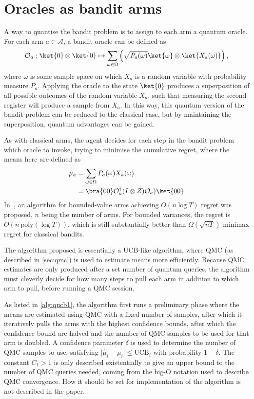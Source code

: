 \section{Oracles as bandit arms}
\label{sec:wan2022}
A way to quantise the bandit problem is to assign to each arm a quantum oracle.
For each arm $a \in \mathcal{A}$, a bandit oracle can be defined as
\begin{equation}
    \mathcal{O}_a: \ket{0}\otimes\ket{0} \mapsto \sum_{\omega \in \Omega} \left(\sqrt{P_a(\omega)} \ket{\omega} \otimes \ket{X_a(\omega)} \right),
    \label{eq:wan_oracle}
\end{equation}
where $\omega$ is some sample space on which $X_a$ is a random variable with probability measure $P_a$.
Applying the oracle to the state $\ket{0}$ produces a superposition of all possible outcomes of the random variable $X_a$, such that measuring the second register will produce a sample from $X_a$.
In this way, this quantum version of the bandit problem can be reduced to the classical case, but by maintaining the superposition, quantum advantages can be gained.

As with classical arms, the agent decides for each step in the bandit problem which oracle to invoke, trying to minimise the cumulative regret, where the means here are defined as
\begin{equation}
    \begin{aligned}
        \mu_a
         & = \sum_{\omega \in \Omega} P_a(\omega) X_a(\omega)                     \\
         & = \bra{00} \mathcal{O}_a^\dagger (I \otimes Z) \mathcal{O}_a) \ket{00} \\
    \end{aligned}
\end{equation}
In~\autocite{wan2022}, an algorithm for bounded-value arms achieving $O(n \log T)$ regret was proposed, $n$ being the number of arms.
For bounded variances, the regret is $O(n \ \text{poly}(\log T))$, which is still substantially better than $\Omega(\sqrt{nT})$ minimax regret for classical bandits.

The algorithm proposed is essentially a UCB-like algorithm, where QMC (as described in \cref{sec:qmc}) is used to estimate means more efficiently.
Because QMC estimates are only produced after a set number of quantum queries, the algorithm must cleverly decide for how many steps to pull each arm in addition to which arm to pull, before running a QMC session.

As listed in \cref{alg:qucb1}, the algorithm first runs a preliminary phase where the means are estimated using QMC with a fixed number of samples, after which it iteratively pulls the arms with the highest confidence bounds, after which the confidence bound are halved and the number of QMC samples to be used for that arm is doubled.
A confidence parameter $\delta$ is used to determine the number of QMC samples to use, satisfying $\lvert\hat{\mu}_i - \mu_i\rvert \leq \text{UCB}_i$ with probability $1-\delta$.
The constant $C_1>1$ is only described existentially to give an upper bound to the number of QMC queries needed, coming from the big-O notation used to describe QMC convergence.
How it should be set for implementation of the algorithm is not described in the paper.


